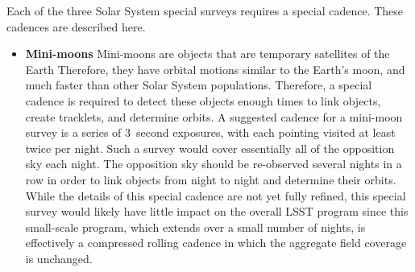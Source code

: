 Each of the three Solar System special surveys requires a special
cadence. These cadences are described here.

\begin{itemize}

\item{{\bf Mini-moons}}
Mini-moons are objects that are temporary satellites of the Earth
\citep{2014Icar..241..280B, 2017Icar..285...83F}
Therefore, they have orbital motions similar to the Earth's moon,
and much faster than other Solar System populations. Therefore,
a special cadence is required to detect these objects enough
times to link objects, create tracklets, and determine orbits.
A suggested cadence for a mini-moon survey is a series
of 3~second exposures, with each pointing visited at least
twice per night. Such a survey would cover essentially
all of the opposition sky each night. The opposition sky should
be re-observed several nights in a row in order to
link objects from night to night and determine their orbits.
While the details of this special cadence are not yet
fully refined, this special survey would likely have little impact
on the overall LSST program since this small-scale
program, which extends over a small number of nights,
is effectively a compressed rolling cadence in which
the aggregate field coverage is unchanged.


\end{itemize}

